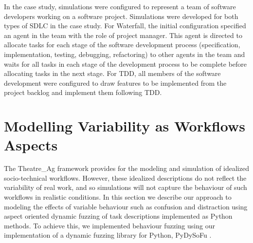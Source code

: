 \documentclass{llncs}
\begin{document}
In the case study, simulations were configured to represent a team of software developers working on a software
project. Simulations were developed for both types of SDLC in the case study.  For Waterfall, the initial configuration
specified an agent in the team with the role of project manager.  This agent is directed to allocate tasks for each
stage of the software development process (specification, implementation, testing, debugging, refactoring) to other
agents in the team and waits for all tasks in each stage of the development process to be complete before allocating
tasks in the next stage.  For TDD, all members of the software development were configured to draw features to be
implemented from the project backlog and implement them following TDD.


\section{Modelling Variability as Workflows Aspects}
\label{sec:fuzzing}


The Theatre\_Ag framework provides for the modeling and simulation of idealized socio-technical workflows.  However,
these idealized descriptions do not reflect the variability of real work, and so simulations will not capture the
behaviour of such workflows in realistic conditions. In this section we describe our approach to modeling the effects of
variable behaviour such as confusion and distraction using aspect oriented dynamic fuzzing of task descriptions
implemented as Python methods.  To achieve this, we implemented behaviour fuzzing using our implementation of a
dynamic fuzzing library for Python, PyDySoFu \cite{storer2016pydysofu-scm}. 
\end{document}
